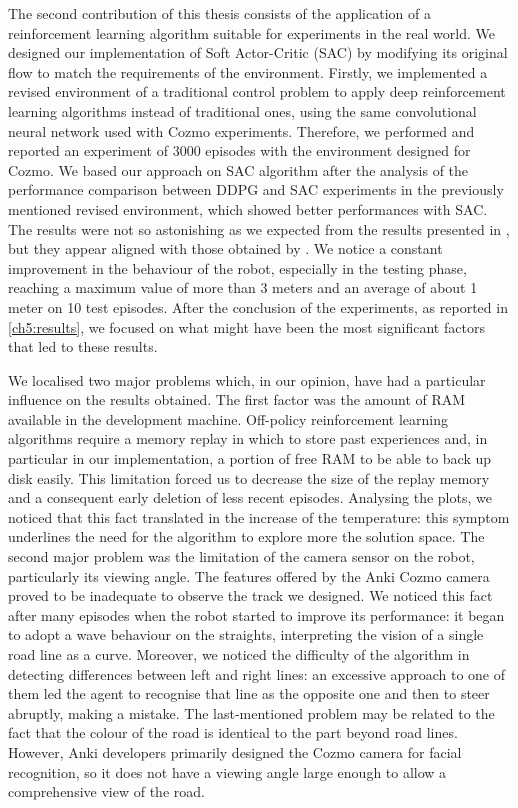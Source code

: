 The second contribution of this thesis consists of the application of a reinforcement learning algorithm suitable for experiments in the real world.
We designed our implementation of Soft Actor-Critic (SAC) by modifying its original flow to match the requirements of the environment.
Firstly, we implemented a revised environment of a traditional control problem to apply deep reinforcement learning algorithms instead of traditional ones, using the same convolutional neural network used with Cozmo experiments.
Therefore, we performed and reported an experiment of 3000 episodes with the environment designed for Cozmo.
We based our approach on SAC algorithm after the analysis of the performance comparison between DDPG and SAC experiments in the previously mentioned revised environment, which showed better performances with SAC.
The results were not so astonishing as we expected from the results presented in \cite{kendall2018learning,kendall2019learning}, but they appear aligned with those obtained by \cite{haarnoja2018alg}.
We notice a constant improvement in the behaviour of the robot, especially in the testing phase, reaching a maximum value of more than 3 meters and an average of about 1 meter on 10 test episodes.
After the conclusion of the experiments, as reported in \vref{ch5:results}, we focused on what might have been the most significant factors that led to these results.

We localised two major problems which, in our opinion, have had a particular influence on the results obtained.
The first factor was the amount of RAM available in the development machine.
Off-policy reinforcement learning algorithms require a memory replay in which to store past experiences and, in particular in our implementation, a portion of free RAM to be able to back up disk easily.
This limitation forced us to decrease the size of the replay memory and a consequent early deletion of less recent episodes.
Analysing the plots, we noticed that this fact translated in the increase of the temperature: this symptom underlines the need for the algorithm to explore more the solution space.
The second major problem was the limitation of the camera sensor on the robot, particularly its viewing angle.
The features offered by the Anki Cozmo camera proved to be inadequate to observe the track we designed.
We noticed this fact after many episodes when the robot started to improve its performance: it began to adopt a wave behaviour on the straights, interpreting the vision of a single road line as a curve.
Moreover, we noticed the difficulty of the algorithm in detecting differences between left and right lines: an excessive approach to one of them led the agent to recognise that line as the opposite one and then to steer abruptly, making a mistake.
The last-mentioned problem may be related to the fact that the colour of the road is identical to the part beyond road lines.
However, Anki developers primarily designed the Cozmo camera for facial recognition, so it does not have a viewing angle large enough to allow a comprehensive view of the road.


